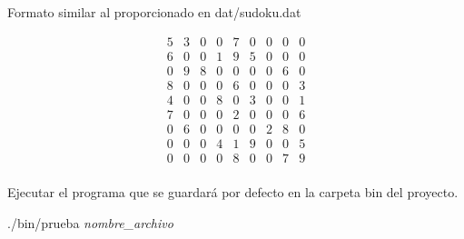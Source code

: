 \documentclass[11pt, a4paper]{article}
\theoremstyle{theorem-style}
\theoremstyle{definition-style}
\theoremstyle{remark-style}
\theoremstyle{example-style}
\begin{document}
Formato similar al proporcionado en dat/sudoku.dat

\[
\begin{array}{ccccccccc}
5 & 3 & 0 & 0 & 7 & 0 & 0 & 0 & 0\\
6 & 0 & 0 & 1 & 9 & 5 & 0 & 0 & 0\\
0 & 9 & 8 & 0 & 0 & 0 & 0 & 6 & 0\\
8 & 0 & 0 & 0 & 6 & 0 & 0 & 0 & 3\\
4 & 0 & 0 & 8 & 0 & 3 & 0 & 0 & 1\\
7 & 0 & 0 & 0 & 2 & 0 & 0 & 0 & 6\\
0 & 6 & 0 & 0 & 0 & 0 & 2 & 8 & 0\\
0 & 0 & 0 & 4 & 1 & 9 & 0 & 0 & 5\\
0 & 0 & 0 & 0 & 8 & 0 & 0 & 7 & 9\\
\end{array}
\]

Ejecutar el programa que se guardará por defecto en la carpeta bin del proyecto. 

./bin/prueba \textit{nombre\_archivo}
	
\end{document}
